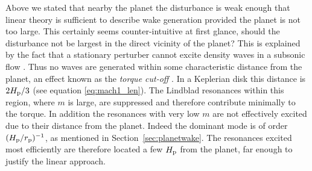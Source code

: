 Above we stated that nearby the planet the disturbance is weak enough that linear theory is sufficient to describe wake generation provided the planet is not too large.
This certainly seems counter-intuitive at first glance, should the disturbance not be largest in the direct vicinity of the planet?
This is explained by the fact that a stationary perturber cannot excite density waves in a subsonic flow \citep{landau1987}.
Thus no waves are generated within some characteristic distance from the planet, an effect known as the \textit{torque cut-off} \citep{goldreich1980}.
In a Keplerian disk this distance is $2H_{\rm p}/3$ (see equation \ref{eq:mach1_len}).
The Lindblad resonances within this region, where $m$ is large, are suppressed and therefore contribute minimally to the torque.
In addition the resonances with very low $m$ are not effectively excited due to their distance from the planet.
Indeed the dominant mode is of order $(H_{\rm p} / r_{\rm p})^{-1}$, as mentioned in Section~\ref{sec:planetwake}.
The resonances excited most efficiently are therefore located a few $H_{\rm p}$ from the planet, far enough to justify the linear approach.

